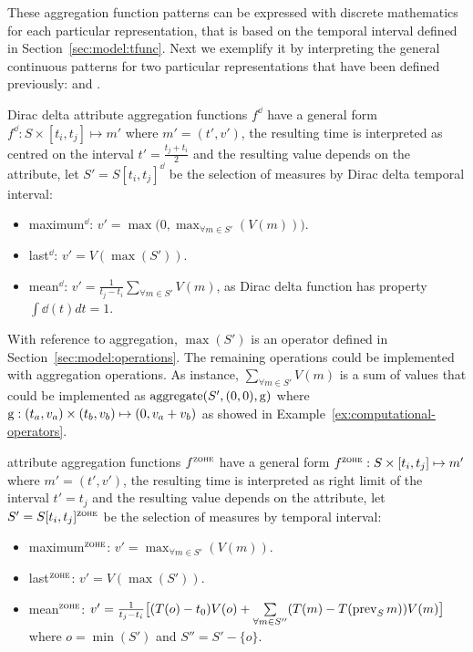 These aggregation function patterns can be expressed with discrete
mathematics for each particular representation, that is based on the
temporal interval defined in Section~\ref{sec:model:tfunc}. Next we
exemplify it by interpreting the general continuous patterns for two
particular representations that have been defined previously: \dd{}
and \zohe{}.


Dirac delta attribute aggregation functions $f^\dd$ have a general
form $f^\dd : S \times [t_i,t_j]\mapsto m'$ where $m'=(t',v')$, the
resulting time is interpreted as centred on the interval
$t'=\frac{t_j+t_i}{2}$ and the resulting value depends on the
attribute, let $S'=S[t_i,t_j]^\dd$ be the selection of measures by
Dirac delta temporal interval:
\begin{itemize}
\item maximum$^\dd$: $v' = \max\big(0,\max_{\forall m \in S'}(V(m))\big)$. 
\item last$^\dd$: $v' = V(\max(S'))$.
\item mean$^\dd$: $v' = \frac{1}{t_j-t_i} \sum\limits_{\forall m
    \in S'} V(m)$, as Dirac delta function has property $\int\dd(t)dt=1$.
\end{itemize}

With reference to  aggregation, $\max(S')$ is an operator
defined in Section~\ref{sec:model:operations}. The remaining
operations could be implemented with aggregation operations. As
instance, $\sum\limits_{\forall m \in S'} V(m)$ is a sum of values
that could be implemented as $\operatorname*{aggregate}(S',(0,0),\operatorname*{g})$ where $\operatorname*{g}:
(t_a,v_a) \times (t_b,v_b) \mapsto (0,v_a+v_b)$ as showed in
Example~\ref{ex:computational-operators}.



\zohe{} attribute aggregation functions $f^\zohe{}$ have a general
form $f^\zohe{} : S \times [t_i,t_j]\mapsto m'$ where $m'=(t',v')$,
the resulting time is interpreted as right limit of the interval
$t'=t_j$ and the resulting value depends on the attribute, let
$S'=S[t_i,t_j]^\zohe{}$ be the selection of measures by \zohe{} temporal
interval:
\begin{itemize}
\item maximum$^\zohe{}$: $v' = \max_{\forall m \in S'}(V(m))$. 
\item last$^\zohe{}$: $v' = V(\max(S'))$.
\item mean$^\zohe{}$: $v' = \frac{1}{t_j-t_i} \big[ (T(o)-t_0)V(o) +
  \sum\limits_{\forall m \in S''}( T(m)- T(\operatorname*{prev}_S
  m) )V(m) \big]$ where $o=\min(S')$ and $S''= S' - \{o\}$.
\end{itemize}

